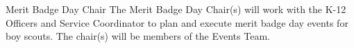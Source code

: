 \begin{enumsubsection}
\item{Merit Badge Day Chair} The Merit Badge Day Chair(s) will work with the K-12 Officers and Service Coordinator to plan and execute merit badge day events for boy scouts.  The chair(s) will be members of the Events Team. 


\end{enumsubsection}






